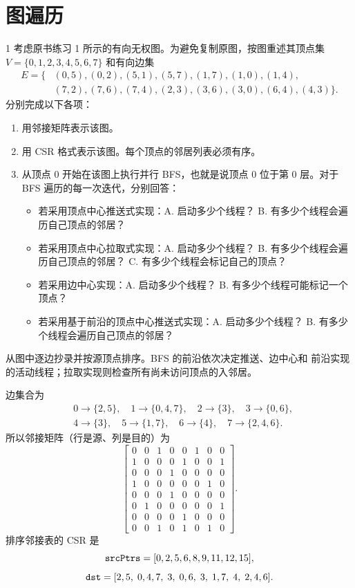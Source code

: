 \chapter{图遍历}

\begin{solutionexercise}{1}
\problemheading 考虑原书练习 1 所示的有向无权图。为避免复制原图，按图重述其顶点集
$V=\{0,1,2,3,4,5,6,7\}$ 和有向边集
\[
\begin{split}
E=\{&(0,5),(0,2),(5,1),(5,7),(1,7),(1,0),(1,4),\\
    &(7,2),(7,6),(7,4),(2,3),(3,6),(3,0),(6,4),(4,3)\}.
\end{split}
\]
分别完成以下各项：
\begin{enumerate}[label=(\alph*)]
  \item 用邻接矩阵表示该图。
  \item 用 CSR 格式表示该图。每个顶点的邻居列表必须有序。
  \item 从顶点 0 开始在该图上执行并行 BFS，也就是说顶点 0 位于第 0 层。对于 BFS
  遍历的每一次迭代，分别回答：
  \begin{itemize}
    \item 若采用顶点中心推送式实现：\textup{A.} 启动多少个线程？
    \textup{B.} 有多少个线程会遍历自己顶点的邻居？
    \item 若采用顶点中心拉取式实现：\textup{A.} 启动多少个线程？
    \textup{B.} 有多少个线程会遍历自己顶点的邻居？
    \textup{C.} 有多少个线程会标记自己的顶点？
    \item 若采用边中心实现：\textup{A.} 启动多少个线程？
    \textup{B.} 有多少个线程可能标记一个顶点？
    \item 若采用基于前沿的顶点中心推送式实现：\textup{A.} 启动多少个线程？
    \textup{B.} 有多少个线程会遍历自己顶点的邻居？
  \end{itemize}
\end{enumerate}

\approachheading 从图中逐边抄录并按源顶点排序。BFS 的前沿依次决定推送、边中心和
前沿实现的活动线程；拉取实现则检查所有尚未访问顶点的入邻居。

\answerheading 边集合为
\[
\begin{split}
&0\to\{2,5\},\quad 1\to\{0,4,7\},\quad 2\to\{3\},
\quad 3\to\{0,6\},\\
&4\to\{3\},\quad 5\to\{1,7\},\quad 6\to\{4\},
\quad 7\to\{2,4,6\}.
\end{split}
\]
所以邻接矩阵（行是源、列是目的）为
\[
\begin{bmatrix}
0&0&1&0&0&1&0&0\\
1&0&0&0&1&0&0&1\\
0&0&0&1&0&0&0&0\\
1&0&0&0&0&0&1&0\\
0&0&0&1&0&0&0&0\\
0&1&0&0&0&0&0&1\\
0&0&0&0&1&0&0&0\\
0&0&1&0&1&0&1&0
\end{bmatrix}.
\]
排序邻接表的 CSR 是
\[
 \code{srcPtrs}=[0,2,5,6,8,9,11,12,15],
\]
\[
 \code{dst}=[2,5,\;0,4,7,\;3,\;0,6,\;3,\;1,7,\;4,\;2,4,6].
\]


\end{solutionexercise}
